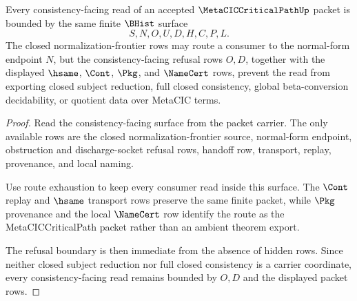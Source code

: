 \begin{theorem}
\label{thm:metacic-critical-path-consistency-refusal-boundary}
Every consistency-facing read of an accepted $\MetaCICCriticalPathUp$ packet is bounded by the same finite $\BHist$ surface
$$
S,N,O,U,D,H,C,P,L.
$$
The closed normalization-frontier rows may route a consumer to the normal-form endpoint $N$, but the consistency-facing refusal rows $O,D$, together with the displayed $\hsame$, $\Cont$, $\Pkg$, and $\NameCert$ rows, prevent the read from exporting closed subject reduction, full closed consistency, global beta-conversion decidability, or quotient data over MetaCIC terms.
\end{theorem}
\begin{proof}
Read the consistency-facing surface from the packet carrier. The only available rows are the closed normalization-frontier source, normal-form endpoint, obstruction and discharge-socket refusal rows, handoff row, transport, replay, provenance, and local naming.

Use route exhaustion to keep every consumer read inside this surface. The $\Cont$ replay and $\hsame$ transport rows preserve the same finite packet, while $\Pkg$ provenance and the local $\NameCert$ row identify the route as the MetaCICCriticalPath packet rather than an ambient theorem export.

The refusal boundary is then immediate from the absence of hidden rows. Since neither closed subject reduction nor full closed consistency is a carrier coordinate, every consistency-facing read remains bounded by $O,D$ and the displayed packet rows.
\end{proof}

